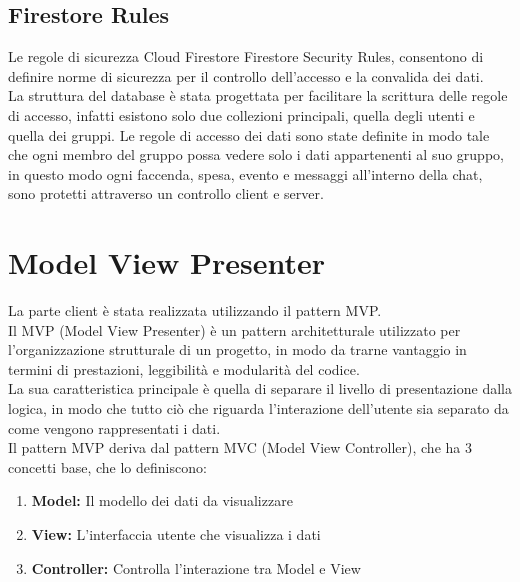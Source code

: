 \subsection{Firestore Rules}
Le regole di sicurezza Cloud Firestore Firestore Security Rules, consentono di definire norme di sicurezza per il controllo dell'accesso e la convalida dei dati.\\
La struttura del database è stata progettata per facilitare la scrittura delle regole di accesso, infatti esistono solo due collezioni principali, quella degli utenti e quella dei gruppi. Le regole di accesso dei dati sono state definite in modo tale che ogni membro del gruppo possa vedere solo i dati appartenenti al suo gruppo, in questo modo ogni faccenda, spesa, evento e messaggi all'interno della chat, sono protetti attraverso un controllo client e server.

\section{Model View Presenter}                 %
La parte client è stata realizzata utilizzando il pattern MVP.\\
Il MVP (Model View Presenter) è un pattern architetturale utilizzato per l'organizzazione strutturale di un progetto, in modo da trarne vantaggio in termini di prestazioni, leggibilità e modularità del codice.\\
La sua caratteristica principale è quella di separare il livello di presentazione dalla logica, in modo che tutto ciò che riguarda l'interazione dell'utente sia separato da come vengono rappresentati i dati.\\
Il pattern MVP deriva dal pattern MVC (Model View Controller), che ha 3 concetti base, che lo definiscono:

\begin{enumerate}
   \item \textbf{Model:} Il modello dei dati da visualizzare
   \item \textbf{View:} L'interfaccia utente che visualizza i dati
   \item \textbf{Controller:} Controlla l'interazione tra Model e View
\end{enumerate}

